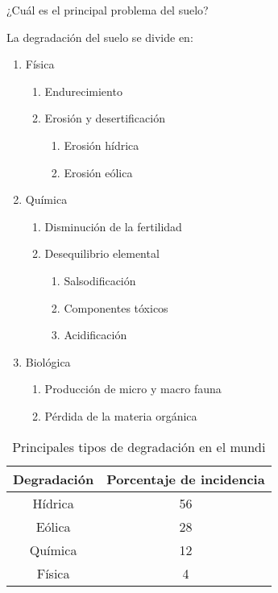 ¿Cuál es el principal problema del suelo?

\begin{remark}
    La degradación del suelo se divide en:
    \begin{enumerate}
        \item Física
        \begin{enumerate}
            \item Endurecimiento
            \item Erosión y desertificación \begin{enumerate}
                \item Erosión hídrica
                \item Erosión eólica
            \end{enumerate}
        \end{enumerate}
        \item Química \begin{enumerate}
            \item Disminución de la fertilidad
            \item Desequilibrio elemental \begin{enumerate}
                \item Salsodificación 
                \item Componentes tóxicos 
                \item Acidificación
            \end{enumerate}
        \end{enumerate}
        \item Biológica \begin{enumerate}
            \item Producción de micro y macro fauna
            \item Pérdida de la materia orgánica
        \end{enumerate}
    \end{enumerate}
\end{remark}
\begin{table}[h!]
    \centering
    \begin{tabular}{@{}cc@{}}
    \toprule
    Degradación & Porcentaje de incidencia \\ \midrule
    Hídrica     & 56                       \\
    Eólica      & 28                       \\
    Química     & 12                       \\
    Física      & 4                        \\ \bottomrule
    \end{tabular}
    \caption{Principales tipos de degradación en el mundi}
    \label{tabcsa1}
\end{table}


